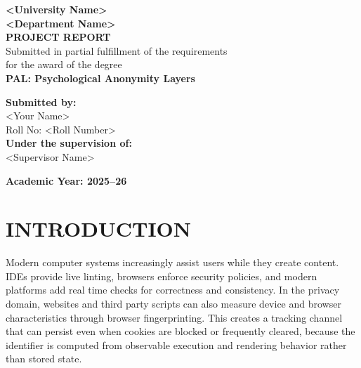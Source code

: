 \documentclass[11pt]{report}
\newcommand{\ProjectTitle}{PAL: Psychological Anonymity Layers}
\newcommand{\StudentName}{<Your Name>}
\newcommand{\RollNo}{<Roll Number>}
\newcommand{\Department}{<Department Name>}
\newcommand{\University}{<University Name>}
\newcommand{\Supervisor}{<Supervisor Name>}
\newcommand{\AcademicYear}{2025--26}
\begin{document}
\begin{titlepage}
\begin{center}
    \vspace*{12mm}
    {\Large \textbf{\University}}\\[8mm]
    {\large \textbf{\Department}}\\[18mm]

    {\Large \textbf{PROJECT REPORT}}\\[6mm]
    {\large Submitted in partial fulfillment of the requirements}\\
    {\large for the award of the degree}\\[10mm]

    {\Large \textbf{\ProjectTitle}}\\[18mm]

    \begin{flushleft}
    \textbf{Submitted by:}\\
    \StudentName\\
    Roll No: \RollNo\\[10mm]

    \textbf{Under the supervision of:}\\
    \Supervisor\\
    \end{flushleft}

    \vfill
    {\large \textbf{Academic Year: \AcademicYear}}
\end{center}
\end{titlepage}


\tableofcontents
\listoffigures
\listoftables
\newpage



\chapter{INTRODUCTION}

Modern computer systems increasingly assist users while they create content. IDEs provide live linting, browsers enforce security policies, and modern platforms add real time checks for correctness and consistency. In the privacy domain, websites and third party scripts can also measure device and browser characteristics through browser fingerprinting. This creates a tracking channel that can persist even when cookies are blocked or frequently cleared, because the identifier is computed from observable execution and rendering behavior rather than stored state.
\end{document}
